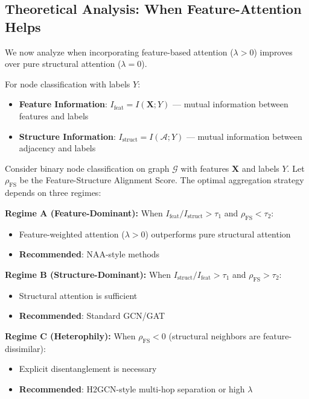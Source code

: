 \subsection{Theoretical Analysis: When Feature-Attention Helps}

We now analyze when incorporating feature-based attention ($\lambda > 0$) improves over pure structural attention ($\lambda = 0$).

\begin{definition}
For node classification with labels $Y$:
\begin{itemize}
    \item \textbf{Feature Information}: $I_{\text{feat}} = I(\mathbf{X}; Y)$ --- mutual information between features and labels
    \item \textbf{Structure Information}: $I_{\text{struct}} = I(\mathcal{A}; Y)$ --- mutual information between adjacency and labels
\end{itemize}
\end{definition}

\begin{theorem}
\label{thm:optimal_regime}
Consider binary node classification on graph $\mathcal{G}$ with features $\mathbf{X}$ and labels $Y$. Let $\rho_{\text{FS}}$ be the Feature-Structure Alignment Score. The optimal aggregation strategy depends on three regimes:

\textbf{Regime A (Feature-Dominant):} When $I_{\text{feat}} / I_{\text{struct}} > \tau_1$ and $\rho_{\text{FS}} < \tau_2$:
\begin{itemize}
    \item Feature-weighted attention ($\lambda > 0$) outperforms pure structural attention
    \item \textbf{Recommended}: NAA-style methods
\end{itemize}

\textbf{Regime B (Structure-Dominant):} When $I_{\text{struct}} / I_{\text{feat}} > \tau_1$ and $\rho_{\text{FS}} > \tau_2$:
\begin{itemize}
    \item Structural attention is sufficient
    \item \textbf{Recommended}: Standard GCN/GAT
\end{itemize}

\textbf{Regime C (Heterophily):} When $\rho_{\text{FS}} < 0$ (structural neighbors are feature-dissimilar):
\begin{itemize}
    \item Explicit disentanglement is necessary
    \item \textbf{Recommended}: H2GCN-style multi-hop separation or high $\lambda$
\end{itemize}
\end{theorem}

